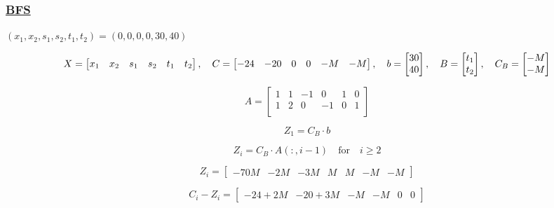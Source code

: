 \vspace{1cm}

\subsubsection*{\underline{BFS}}
\((x_1,x_2,s_1,s_2,t_1,t_2) = (0,0,0,0,30,40)\)

\[
X = \left[\begin{matrix} x_1 & x_2 & s_1 & s_2 & t_1 & t_2 \end{matrix}\right], \hspace{0.35cm}
C = \left[\begin{matrix} -24 & -20 & 0 & 0 & -M & -M \end{matrix}\right], \hspace{0.35cm}
b = \left[\begin{matrix} 30 \\ 40 \end{matrix}\right], \hspace{0.35cm}
B = \left[\begin{matrix} t_1 \\ t_2 \end{matrix}\right], \hspace{0.35cm}
C_B = \left[\begin{matrix} -M \\ -M \end{matrix}\right]
\]


\vspace{0.5cm}
\[
    A = \left[\begin{matrix} 1 & 1 & -1 & 0 & 1 & 0\\
                             1 & 2 & 0 & -1 & 0 & 1\\
                            \end{matrix}\right]
\]

\vspace{0.6cm}

\[Z_1 = C_B \cdot b\] 


\[Z_i = C_B \cdot A(:, i-1) \quad \text{for} \quad i \geq 2\] 

\[Z_i =  \left[\begin{matrix} -70M & -2M & -3M & M & M & -M & -M  \end{matrix}\right]\]

\vspace{0.5cm}

\[C_i-Z_i = \left[\begin{matrix} -24 + 2M & -20 + 3M & -M & -M & 0 & 0 \end{matrix}\right]\]

